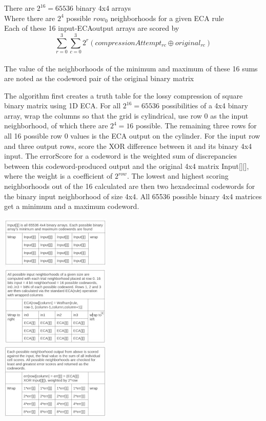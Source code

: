\documentclass[11pt]{article}
\begin{document}
\begin{center}
There are $2^{16}=65536$ binary 4x4 arrays\\
 Where there are $2^4$ possible $row_0$ neighborhoods for a given ECA rule\\
 Each of these 16 input-ECAoutput arrays are scored by\\
\[  \sum_{r=0}^{3} \sum_{c=0}^{3} 2^r ( compressionAttempt_{r c} \oplus original_{r c}) \]\\
 The value of the neighborhoods of the minimum and maximum of these 16 sums are noted as the codeword pair of the original binary matrix  \\
\end{center}
The algorithm first creates a truth table for the lossy compression of square binary matrix using 1D ECA. For all $2^{16}=65536$ possibilities of a 4x4 binary array, wrap the columns so that the grid is cylindrical, use row 0 as the input neighborhood, of which there are $2^4=16$ possible. The remaining three rows for all 16 possible row 0 values is the ECA output on the cylinder. For the input row and three output rows, score the XOR difference between it and its binary 4x4 input. The errorScore for a codeword is the weighted sum of discrepancies between this codeword-produced output and the original 4x4 matrix Input[][], where the weight is a coefficient of $2^{row}$. The lowest and highest scoring neighborhoods out of the 16 calculated are then two hexadecimal codewords for the binary input neighborhood of size 4x4. All 65536 possible binary 4x4 matrices get a minimum and a maximum codeword.\\
\begin{center}
\includegraphics{inputGrid}\\
\includegraphics{ecaGrid}\\
\includegraphics{errorGrid}\\
\end{center}
\end{document}
